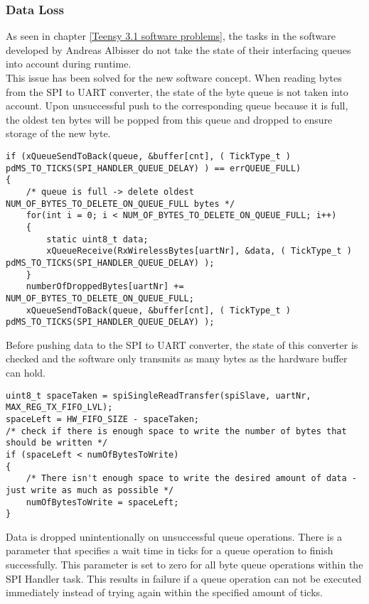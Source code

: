 \subsubsection{Data Loss}
As seen in chapter \ref{Teensy 3.1 software problems}, the tasks in the software developed by Andreas Albisser do not take the state of their interfacing queues into account during runtime.\\
This issue has been solved for the new software concept. When reading bytes from the SPI to UART converter, the state of the byte queue is not taken into account. Upon unsuccessful push to the corresponding queue because it is full, the oldest ten bytes will be popped from this queue and dropped to ensure storage of the new byte.\\
\begin{lstlisting}
if (xQueueSendToBack(queue, &buffer[cnt], ( TickType_t ) pdMS_TO_TICKS(SPI_HANDLER_QUEUE_DELAY) ) == errQUEUE_FULL)
{
    /* queue is full -> delete oldest NUM_OF_BYTES_TO_DELETE_ON_QUEUE_FULL bytes */
    for(int i = 0; i < NUM_OF_BYTES_TO_DELETE_ON_QUEUE_FULL; i++)
    {
        static uint8_t data;
        xQueueReceive(RxWirelessBytes[uartNr], &data, ( TickType_t ) pdMS_TO_TICKS(SPI_HANDLER_QUEUE_DELAY) );
    }
    numberOfDroppedBytes[uartNr] += NUM_OF_BYTES_TO_DELETE_ON_QUEUE_FULL;
    xQueueSendToBack(queue, &buffer[cnt], ( TickType_t ) pdMS_TO_TICKS(SPI_HANDLER_QUEUE_DELAY) );
\end{lstlisting}
Before pushing data to the SPI to UART converter, the state of this converter is checked and the software only transmits as many bytes as the hardware buffer can hold.
\begin{lstlisting}
uint8_t spaceTaken = spiSingleReadTransfer(spiSlave, uartNr, MAX_REG_TX_FIFO_LVL);
spaceLeft = HW_FIFO_SIZE - spaceTaken;
/* check if there is enough space to write the number of bytes that should be written */
if (spaceLeft < numOfBytesToWrite)
{
    /* There isn't enough space to write the desired amount of data - just write as much as possible */
    numOfBytesToWrite = spaceLeft;
}
\end{lstlisting}
Data is dropped unintentionally on unsuccessful queue operations. There is a parameter that specifies a wait time in ticks for a queue operation to finish successfully. This parameter is set to zero for all byte queue operations within the SPI Handler task. This results in failure if a queue operation can not be executed immediately instead of trying again within the specified amount of ticks.
